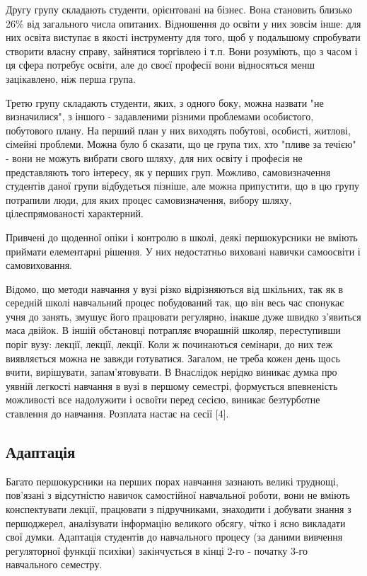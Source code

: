\documentclass[a4paper,12pt, titlepage]{article}
\begin{document}
    Другу групу складають студенти, орієнтовані на бізнес. Вона
    становить близько 26\% від загального числа опитаних. Відношення до
    освіти у них зовсім інше: для них освіта виступає в якості
    інструменту для того, щоб у подальшому спробувати створити власну справу, зайнятися торгівлею і т.п.
    Вони розуміють, що з часом і ця сфера потребує освіти, але до
    своєї професії вони відносяться менш зацікавлено, ніж перша група.

    Третю групу складають студенти, яких, з одного боку, можна
    назвати "не визначилися", з іншого - задавленими різними
    проблемами особистого, побутового плану. На перший план у них виходять
    побутові, особисті, житлові, сімейні проблеми. Можна було б сказати,
    що це група тих, хто "пливе за течією" - вони не можуть вибрати свого
    шляху, для них освіту і професія не представляють того інтересу, як у
    перших груп. Можливо, самовизначення студентів даної групи
    відбудеться пізніше, але можна припустити, що в цю групу потрапили люди,
    для яких процес самовизначення, вибору шляху, цілеспрямованості характерний.

    Привчені до щоденної опіки і контролю в школі, деякі
    першокурсники не вміють приймати елементарні рішення. У них
    недостатньо виховані навички самоосвіти і самовиховання.

    Відомо, що методи навчання у вузі різко відрізняються від шкільних,
    так як в середній школі навчальний процес побудований так, що він весь час
    спонукає учня до занять, змушує його працювати регулярно, інакше
    дуже швидко з'явиться маса двійок. В іншій обстановці потрапляє вчорашній
    школяр, переступивши поріг вузу: лекції, лекції, лекції. Коли ж
    починаються семінари, до них теж виявляється можна не завжди готуватися.
    Загалом, не треба кожен день щось вчити, вирішувати, запам'ятовувати. В
    Внаслідок нерідко виникає думка про уявній легкості навчання в вузі
    в першому семестрі, формується впевненість можливості все надолужити і
    освоїти перед сесією, виникає безтурботне ставлення до навчання. Розплата
    настає на сесії [4].
    \subsection{Адаптація}
    Багато першокурсники на перших порах навчання зазнають
    великі труднощі, пов'язані з відсутністю навичок самостійної
    навчальної роботи, вони не вміють конспектувати лекції, працювати з
    підручниками, знаходити і добувати знання з першоджерел, аналізувати
    інформацію великого обсягу, чітко і ясно викладати свої думки.
    Адаптація студентів до навчального процесу (за даними вивчення
    регуляторної функції психіки) закінчується в кінці 2-го - початку 3-го
    навчального семестру.
\end{document}
